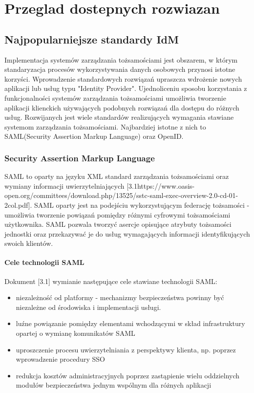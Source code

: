 \chapter{Przeglad dostepnych rozwiazan}
\label{cha:przegladRozwiazan}


\section{Najpopularniejsze standardy IdM}
\label{sec:standardyIdM}

Implementacja systemów zarządzania tożsamościami jest obszarem, w którym standaryzacja procesów wykorzystywania danych osobowych przynosi istotne korzyści. Wprowadzenie standardowych rozwiązań upraszcza wdrożenie nowych aplikacji lub usług typu "Identity Provider". Ujednoliceniu sposobu korzystania z funkcjonalności systemów zarządzania tożsamościami umożliwia tworzenie aplikacji klienckich używających podobnych rozwiązań dla dostępu do różnych usług. Rozwijanych jest wiele standardów realizujących wymagania stawiane systemom zarządzania tożsamościami. Najbardziej istotne z nich to SAML(Security Assertion Markup Language) oraz OpenID. 

\subsection{Security Assertion Markup Language}

	SAML to oparty na języku XML standard zarządzania tożsamościami oraz wymiany informacji uwierzytelniających [3.1https://www.oasis-open.org/committees/download.php/13525/sstc-saml-exec-overview-2.0-cd-01-2col.pdf]. SAML oparty jest na podejściu wykorzystującym federację tożsamości - umożliwia tworzenie powiązań pomiędzy różnymi cyfrowymi tożsamościami użytkownika. SAML pozwala tworzyć asercje opisujące atrybuty tożsamości jednostki oraz przekazywać je do usług wymagających informacji identyfikujących swoich klientów.

	\subsubsection{Cele technologii SAML}

		Dokument [3.1] wymianie następujące cele stawiane technologii SAML:

		\begin{itemize}
		  \item niezależność od platformy - mechanizmy bezpieczeństwa powinny być niezależne od środowiska i implementacji usługi.
		  \item luźne powiązanie pomiędzy elementami wchodzącymi w skład infrastruktury opartej o wymianę komunikatów SAML
		  \item uproszczenie procesu uwierzytelniania z perspektywy klienta, np. poprzez wprowadzenie procedury SSO
		  \item redukcja kosztów administracyjnych poprzez zastąpienie wielu oddzielnych modułów bezpieczeństwa jednym wspólnym dla  różnych aplikacji
		\end{itemize}

